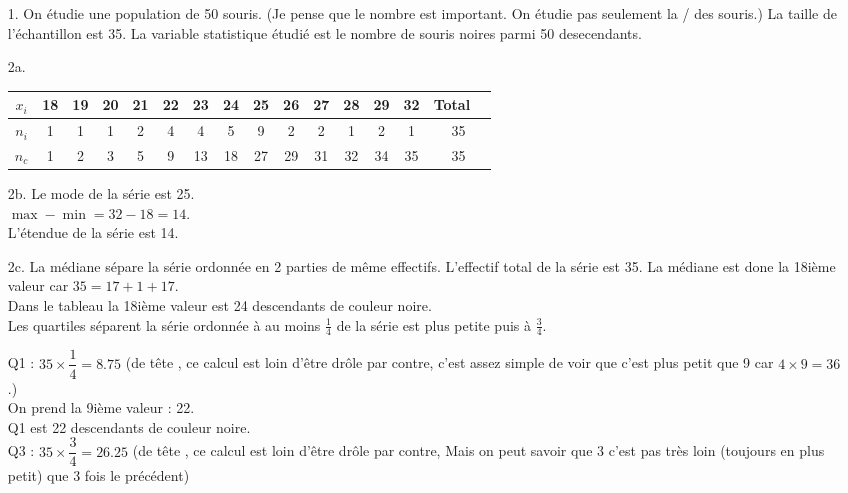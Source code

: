 \documentclass[11pt]{article}
\begin{document}
\begin{enumerate}
  \item[1.] On étudie une population de 50 souris. (Je pense que le nombre est important. On étudie pas seulement la / des souris.) La taille de l'échantillon est 35. La variable statistique étudié est le nombre de souris noires parmi 50 desecendants.

  \item[2a.]
  \begin{center}
    \begin{tabular}{|c||c|c|c|c|c|c|c|c|c|c|c|c|c||c|}
      \hline
      $x_i$ & 18 & 19 & 20 & 21 & 22 & 23 & 24 & 25 & 26 & 27 & 28 & 29 & 32 & Total  \\
      \hline
      $n_i$ &  1 &  1 &  1 &  2 &  4 &  4 &  5 &  9 &  2 &  2 &  1 &  2 &  1 & 35 \\
      \hline
      $n_c$ &  1 &  2 &  3 &  5 &  9 & 13 & 18 & 27 & 29 & 31 & 32 & 34 &  35 & 35 \\
      \hline      
    \end{tabular}
  \end{center}

  \item[2b.] Le mode de la série est 25. \\
  $\max - \min = 32 - 18 = 14$.\\
  L'étendue de la série est 14.

  \item[2c.] La médiane sépare la série ordonnée en 2 parties de même effectifs. L'effectif total de la série est 35. La médiane est done la 18ième valeur car $35 = 17 + 1 + 17$.\\

  Dans le tableau la 18ième valeur est 24 descendants de couleur noire.\\

  Les quartiles séparent la série ordonnée à au moins $\frac{1}{4}$ de la série est plus petite puis à $\frac{3}{4}$.

  Q1 : $35 \times \dfrac{1}{4} = 8.75$ (de tête , ce calcul est loin d'être drôle par contre, c'est assez simple de voir que c'est plus petit que 9 car $4\times9 = 36$.) \\

  On prend la 9ième valeur : 22.\\
  Q1 est 22 descendants de couleur noire.\\

  Q3 : $35 \times \dfrac{3}{4} = 26.25$ (de tête , ce calcul est loin d'être drôle par contre, Mais on peut savoir que 3 c'est pas très loin (toujours en plus petit) que 3 fois le précédent)\\


\end{enumerate}
\end{document}
